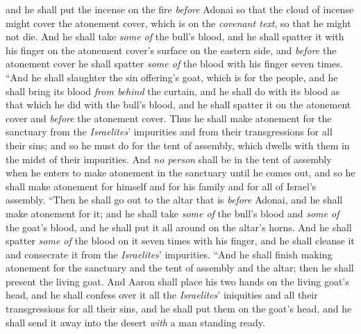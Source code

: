 \begin{biblechapter}
\verse and he shall put the incense on the fire \textit{before} Adonai so that the cloud of incense might cover the atonement cover, which is on the \textit{covenant text}, so that he might not die.
\verse And he shall take \textit{some of} the bull’s blood, and he shall spatter it with his finger on the atonement cover’s surface on the eastern side, and \textit{before} the atonement cover he shall spatter \textit{some of} the blood with his finger seven times.
\verse “And he shall slaughter the sin offering’s goat, which is for the people, and he shall bring its blood \textit{from behind} the curtain, and he shall do with its blood as that which he did with the bull’s blood, and he shall spatter it on the atonement cover and \textit{before} the atonement cover.
\verse Thus he shall make atonement for the sanctuary from the \textit{Israelites}’ impurities and from their transgressions for all their sins; and so he must do for the tent of assembly, which dwells with them in the midst of their impurities.
\verse And \textit{no person} shall be in the tent of assembly when he enters to make atonement in the sanctuary until he comes out, and so he shall make atonement for himself and for his family and for all of Israel’s assembly.
\verse “Then he shall go out to the altar that is \textit{before} Adonai, and he shall make atonement for it; and he shall take \textit{some of} the bull’s blood and \textit{some of} the goat’s blood, and he shall put it all around on the altar’s horns.
\verse And he shall spatter \textit{some of} the blood on it seven times with his finger, and he shall cleanse it and consecrate it from the \textit{Israelites}’ impurities.
\verse “And he shall finish making atonement for the sanctuary and the tent of assembly and the altar; then he shall present the living goat.
\verse And Aaron shall place his two hands on the living goat’s head, and he shall confess over it all the \textit{Israelites}’ iniquities and all their transgressions for all their sins, and he shall put them on the goat’s head, and he shall send it away into the desert \textit{with} a man standing ready.

\end{biblechapter}
